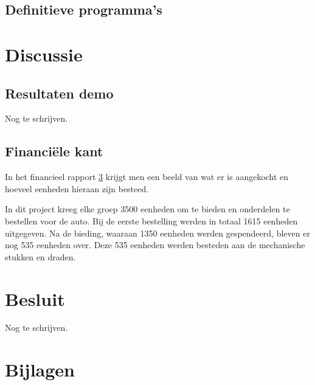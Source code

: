 \documentclass[a4paper,twoside,kulak]{kulakreport} %
\begin{document}
\subsection{Definitieve programma's}



\section{Discussie} %
\subsection{Resultaten demo} 
Nog te schrijven. 

\subsection{Financiële kant} 
In het financieel rapport \ref{financieel rapport} krijgt men een beeld van wat er is aangekocht en hoeveel eenheden hieraan zijn besteed.  

In dit project kreeg elke groep 3500 eenheden om te bieden en onderdelen te bestellen voor de auto. Bij de eerste bestelling werden in totaal 1615 eenheden uitgegeven. Na de bieding, waaraan 1350 eenheden werden gespendeerd, bleven er nog 535 eenheden over. Deze 535 eenheden werden besteden aan de mechanische stukken en draden. 



\section{Besluit}
Nog te schrijven.



\newpage

\section{Bijlagen}
\label{financieel rapport}





\end{document}
